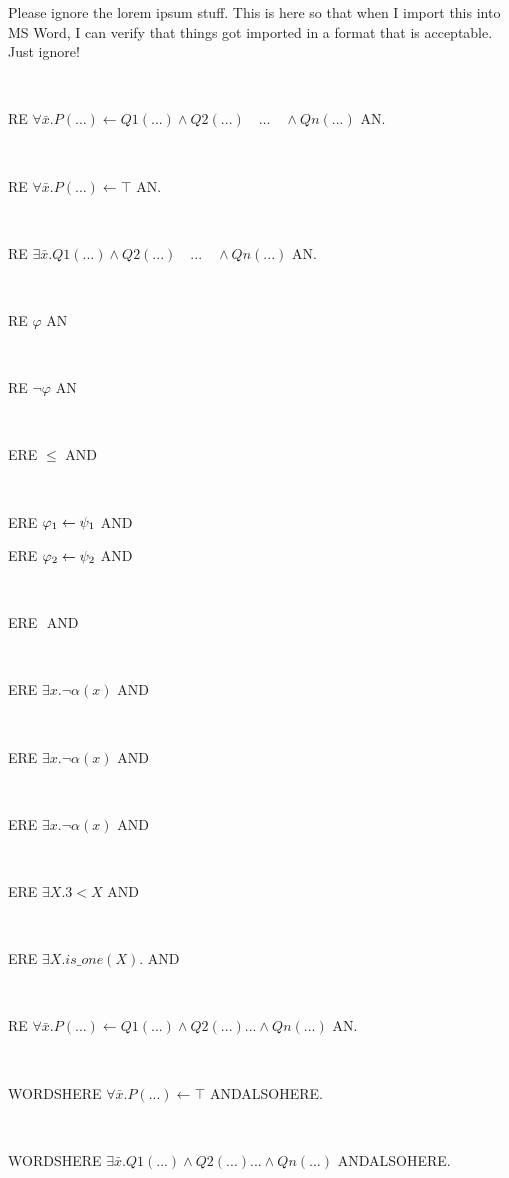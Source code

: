 \documentclass[12pt]{article}
\begin{document}
Please ignore the lorem ipsum stuff. This is here so that when I import this into MS Word, I can verify that things got imported in a format that is acceptable.  Just ignore!

\centerline{~}

RE $ \forall \bar{x}. P(...) \leftarrow Q1(...) \wedge Q2(...) \quad ... \quad \wedge Qn(...) $ AN.

\centerline{~}

RE $ \forall \bar{x}. P(...) \leftarrow \top  $ AN.

\centerline{~}

RE $ \exists \bar{x}.  Q1(...) \wedge Q2(...) \quad ... \quad \wedge Qn(...)  $ AN.


\centerline{~}

RE $ \varphi   $ AN

\centerline{~}

RE $ \neg \varphi   $ AN

\centerline{~}

ERE $ \leq   $ AND

\centerline{~}

ERE $ \varphi_{\scriptsize 1} \leftarrow \psi_{\scriptsize 1}   $ AND

ERE $ \varphi_{\scriptsize 2} \leftarrow \psi_{\scriptsize 2}   $ AND

\centerline{~}

ERE $    $ AND

\centerline{~}

ERE $ \exists x. \neg \alpha(x)   $ AND

\centerline{~}

ERE $ \exists x. \neg \alpha(x)   $ AND


\centerline{~}

ERE $ \exists x. \neg \alpha(x)   $ AND

\centerline{~}

ERE $ \exists X. 3 < X  $ AND

\centerline{~}

ERE $ \exists X. is\_one(X).  $ AND

\centerline{~}

RE $ \forall \bar{x}. P(...) \leftarrow Q1(...) \wedge Q2(...) ... \wedge Qn(...) $ AN.

\centerline{~}

WORDSHERE $ \forall \bar{x}. P(...) \leftarrow \top  $ ANDALSOHERE.

\centerline{~}

WORDSHERE $ \exists \bar{x}.  Q1(...) \wedge Q2(...) ... \wedge Qn(...)  $ ANDALSOHERE.
\end{document}
